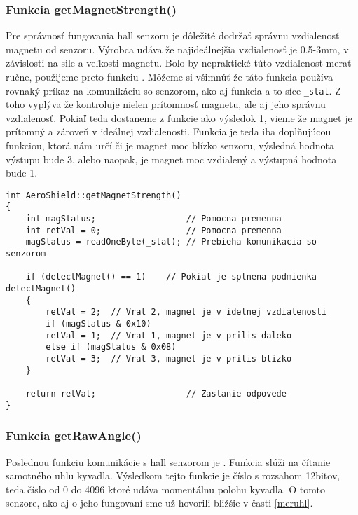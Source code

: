 \subsubsection{Funkcia getMagnetStrength()}

Pre správnosť fungovania hall senzoru je dôležité dodržať správnu vzdialenosť magnetu od senzoru. Výrobca udáva že najideálnejšia vzdialenosť je 0.5-3mm, v závislosti na sile a veľkosti magnetu. Bolo by nepraktické túto vzdialenosť merať ručne, použijeme preto funkciu . Môžeme si všimnúť že táto funkcia používa rovnaký príkaz na komunikáciu so senzorom, ako aj funkcia  a to síce \verb|_stat|. Z toho vyplýva že  kontroluje nielen prítomnosť magnetu, ale aj jeho správnu vzdialenosť. Pokiaľ teda dostaneme z funkcie  ako výsledok 1, vieme že magnet je prítomný a zároveň v ideálnej vzdialenosti. Funkcia  je teda iba doplňujúcou funkciou, ktorá nám určí či je magnet moc blízko senzoru, výsledná hodnota výstupu bude 3, alebo naopak, je magnet moc vzdialený a výstupná hodnota bude 1. 

\begin{lstlisting}[caption={Zdrojový kód funkcie getMagnetStrength.},captionpos=b]
int AeroShield::getMagnetStrength()   
{
	int magStatus;                  // Pomocna premenna 
	int retVal = 0;                 // Pomocna premenna
	magStatus = readOneByte(_stat);	// Prebieha komunikacia so senzorom       
	
	if (detectMagnet() == 1)	// Pokial je splnena podmienka detectMagnet()
	{
		retVal = 2;  // Vrat 2, magnet je v idelnej vzdialenosti
		if (magStatus & 0x10)
		retVal = 1;  // Vrat 1, magnet je v prilis daleko
		else if (magStatus & 0x08)
		retVal = 3;  // Vrat 3, magnet je v prilis blizko
	}
	
	return retVal;                  // Zaslanie odpovede  
}
\end{lstlisting}

\subsubsection{Funkcia getRawAngle()}

Poslednou funkciu komunikácie s hall senzorom je . Funkcia slúži na čítanie samotného uhlu kyvadla. Výsledkom tejto funkcie je číslo s rozsahom 12bitov, teda číslo od 0 do 4096 ktoré udáva momentálnu polohu kyvadla. O tomto senzore, ako aj o jeho fungovaní sme už hovorili bližšie v časti \ref{meruhl}. 

